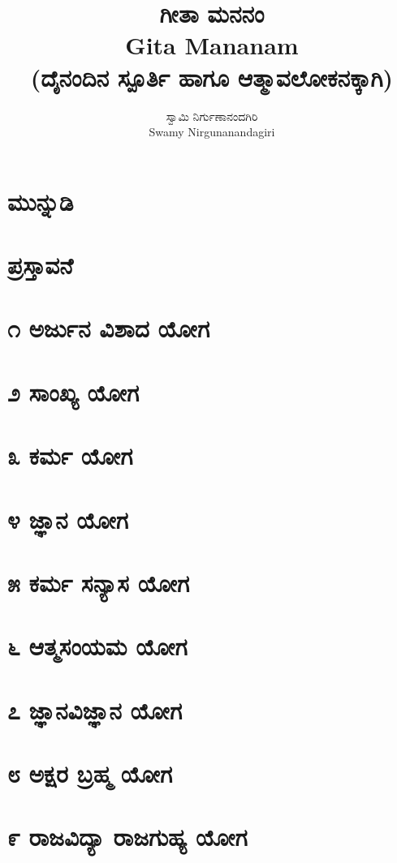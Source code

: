 \documentclass[12pt,twoside,openright,a5paper]{book}
\title{\Huge \kanfont ಗೀತಾ ಮನನಂ\\Gita Mananam\\\small(ದೈನಂದಿನ ಸ್ಪೂರ್ತಿ ಹಾಗೂ ಆತ್ಮಾವಲೋಕನಕ್ಕಾಗಿ)}
\author{\large \kanfont ಸ್ವಾಮಿ ನಿರ್ಗುಣಾನಂದಗಿರಿ\\Swamy Nirgunanandagiri}
\begin{document}
\maketitle

\thispagestyle{empty}
\tableofcontents
\thispagestyle{empty}
\thispagestyle{empty}
\pagestyle{fancy}
\chapter{\kanfont ಮುನ್ನುಡಿ}

\chapter{\kanfont ಪ್ರಸ್ತಾವನೆ}

\chapter{\kanfont ೧ ಅರ್ಜುನ ವಿಶಾದ ಯೋಗ}

\chapter{\kanfont ೨ ಸಾಂಖ್ಯ ಯೋಗ}
\chapter{\kanfont ೩ ಕರ್ಮ ಯೋಗ}
\chapter{\kanfont ೪ ಜ್ಞಾನ ಯೋಗ}
\chapter{\kanfont ೫ ಕರ್ಮ ಸನ್ಯಾಸ ಯೋಗ}

\chapter{\kanfont ೬ ಆತ್ಮಸಂಯಮ ಯೋಗ}
\chapter{\kanfont ೭ ಜ್ಞಾನವಿಜ್ಞಾನ ಯೋಗ}
\chapter{\kanfont ೮ ಅಕ್ಷರ ಬ್ರಹ್ಮ ಯೋಗ}
\chapter{\kanfont ೯ ರಾಜವಿದ್ಯಾ ರಾಜಗುಹ್ಯ ಯೋಗ}
\end{document}
